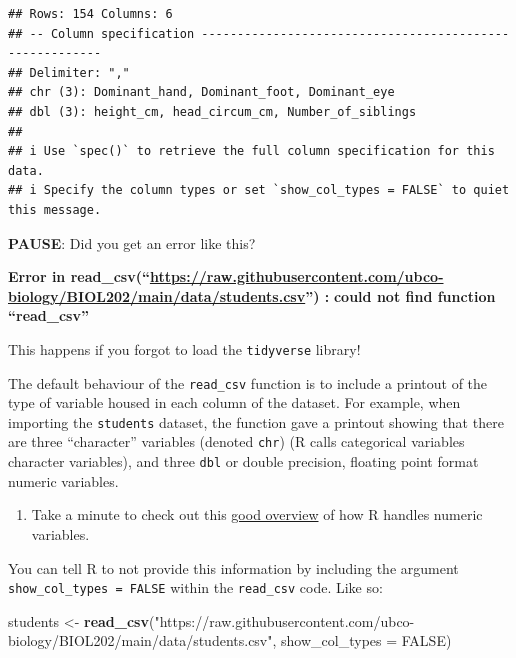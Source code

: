 \documentclass[
]{book}
\newenvironment{Shaded}{\begin{snugshade}}{\end{snugshade}}
\newcommand{\AttributeTok}[1]{\textcolor[rgb]{0.13,0.29,0.53}{#1}}
\newcommand{\ConstantTok}[1]{\textcolor[rgb]{0.56,0.35,0.01}{#1}}
\newcommand{\FunctionTok}[1]{\textcolor[rgb]{0.13,0.29,0.53}{\textbf{#1}}}
\newcommand{\NormalTok}[1]{#1}
\newcommand{\OtherTok}[1]{\textcolor[rgb]{0.56,0.35,0.01}{#1}}
\newcommand{\StringTok}[1]{\textcolor[rgb]{0.31,0.60,0.02}{#1}}
\providecommand{\tightlist}{%
  \setlength{\itemsep}{0pt}\setlength{\parskip}{0pt}}
\begin{document}
\begin{verbatim}
## Rows: 154 Columns: 6
## -- Column specification --------------------------------------------------------
## Delimiter: ","
## chr (3): Dominant_hand, Dominant_foot, Dominant_eye
## dbl (3): height_cm, head_circum_cm, Number_of_siblings
## 
## i Use `spec()` to retrieve the full column specification for this data.
## i Specify the column types or set `show_col_types = FALSE` to quiet this message.
\end{verbatim}

\textbf{PAUSE}: Did you get an error like this?

\textbf{Error in read\_csv(``\url{https://raw.githubusercontent.com/ubco-biology/BIOL202/main/data/students.csv}'') : }
\textbf{could not find function ``read\_csv''}

This happens if you forgot to load the \texttt{tidyverse} library!

The default behaviour of the \texttt{read\_csv} function is to include a printout of the type of variable housed in each column of the dataset. For example, when importing the \texttt{students} dataset, the function gave a printout showing that there are three ``character'' variables (denoted \texttt{chr}) (R calls categorical variables character variables), and three \texttt{dbl} or double precision, floating point format numeric variables.

\begin{enumerate}
\def\labelenumi{\arabic{enumi}.}
\tightlist
\item
  Take a minute to check out this \href{https://www.burns-stat.com/documents/tutorials/impatient-r/more-r-key-objects/more-r-numbers/}{good overview} of how R handles numeric variables.
\end{enumerate}

You can tell R to not provide this information by including the argument \texttt{show\_col\_types\ =\ FALSE} within the \texttt{read\_csv} code. Like so:

\begin{Shaded}
\begin{Highlighting}[]
\NormalTok{students }\OtherTok{\textless{}{-}} \FunctionTok{read\_csv}\NormalTok{(}\StringTok{"https://raw.githubusercontent.com/ubco{-}biology/BIOL202/main/data/students.csv"}\NormalTok{,}
                     \AttributeTok{show\_col\_types =} \ConstantTok{FALSE}\NormalTok{)}
\end{Highlighting}
\end{Shaded}
\end{document}
